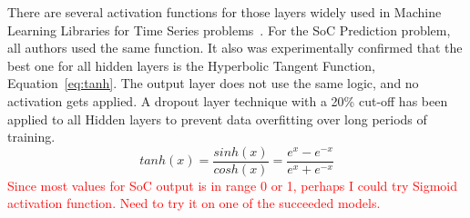 %
%
There are several activation functions for those layers widely used in Machine Learning Libraries for Time Series problems~\cite{amidi_cs_2018}.
For the SoC Prediction problem, all authors used the same function.
It also was experimentally confirmed that the best one for all hidden layers is the Hyperbolic Tangent Function, Equation~\ref{eq:tanh}.
The output layer does not use the same logic, and no activation gets applied.
A dropout layer technique with a 20\% cut-off has been applied to all Hidden layers to prevent data overfitting over long periods of training.
\begin{equation}
    tanh(x) = \frac{sinh(x)}{cosh(x)}=\frac{e^x-e^{-x}}{e^x+e^{-x}}
    \label{eq:tanh}
\end{equation}
\textcolor{red}{Since most values for SoC output is in range 0 or 1, perhaps I could try Sigmoid activation function. Need to try it on one of the succeeded models.} \\ \\
%
%


